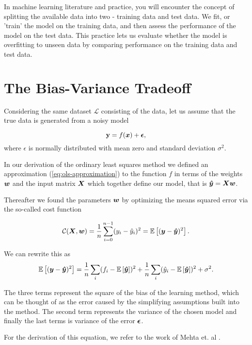 In machine learning literature and practice, you will encounter the concept of
splitting the available data into two - training data and test data. We fit, or 'train'
the model on the training data, and then assess the performance of the model on the 
test data. This practice lets us evaluate whether the model is overfitting to unseen
data by comparing performance on the training data and test data.

\section{The Bias-Variance Tradeoff}\label{sec:bias-variance}
Considering the same dataset $\mathcal{L}$ consisting of the data,
let us assume that the true data is generated from a noisy model

$$\mathbf{y}=f({\boldsymbol{x}}) + {\boldsymbol{\epsilon}},$$
where $\epsilon$ is normally distributed with mean zero and standard deviation $\sigma^2$.

In our derivation of the ordinary least squares method we defined
an approximation (\ref{eq:ols-approximation}) to the function $f$ in terms of the 
weights ${\boldsymbol{w}}$ and the input matrix ${\boldsymbol{X}}$ which together define our model,
that is ${\boldsymbol{\hat{y}}}={\boldsymbol{X}}{\boldsymbol{w}}$. 

Thereafter we found the parameters ${\boldsymbol{w}}$ by optimizing the means squared error via the so-called cost function

$$\mathcal{C}({\boldsymbol{X}},{\boldsymbol{w}}) =\frac{1}{n}\sum_{i=0}^{n-1}(y_i-\hat{y}_i)^2=\mathbb{E}\left[({\boldsymbol{y}}-{\boldsymbol{\hat{y}}})^2\right].$$

We can rewrite this as 
$$\mathbb{E}\left[({\boldsymbol{y}}-{\boldsymbol{\hat{y}}})^2\right]=\frac{1}{n}\sum_i(f_i-\mathbb{E}\left[{\boldsymbol{\hat{y}}}\right])^2+\frac{1}{n}\sum_i(\hat{y}_i-\mathbb{E}\left[{\boldsymbol{\hat{y}}}\right])^2+\sigma^2.$$

The three terms represent the square of the bias of the learning
method, which can be thought of as the error caused by the simplifying
assumptions built into the method. The second term represents the
variance of the chosen model and finally the last terms is variance of
the error ${\boldsymbol{\epsilon}}$.

For the derivation of this equation, we refer to the work of Mehta et. al \cite{Mehta2019}.

